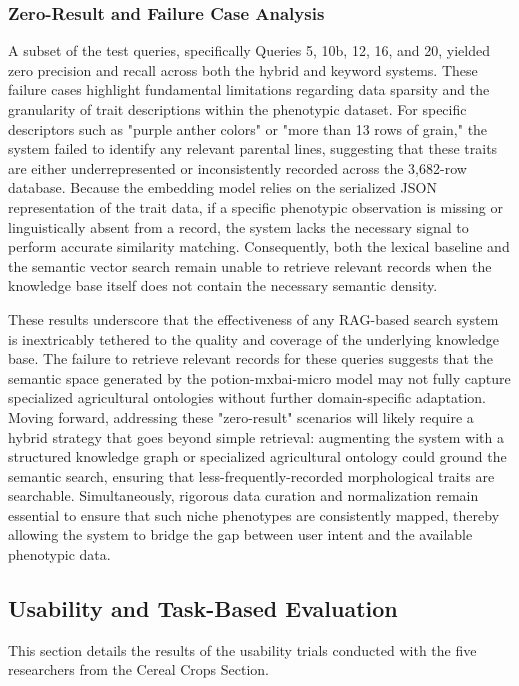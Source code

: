 \documentclass[journal]{./IEEE/IEEEtran}
\begin{document}
\subsubsection{Zero-Result and Failure Case Analysis}
A subset of the test queries, specifically Queries 5, 10b, 12, 16, and 20, yielded zero precision and recall across both the hybrid and keyword systems. These failure cases highlight fundamental limitations regarding data sparsity and the granularity of trait descriptions within the phenotypic dataset. For specific descriptors such as "purple anther colors" or "more than 13 rows of grain," the system failed to identify any relevant parental lines, suggesting that these traits are either underrepresented or inconsistently recorded across the 3,682-row database. Because the embedding model relies on the serialized JSON representation of the trait data, if a specific phenotypic observation is missing or linguistically absent from a record, the system lacks the necessary signal to perform accurate similarity matching. Consequently, both the lexical baseline and the semantic vector search remain unable to retrieve relevant records when the knowledge base itself does not contain the necessary semantic density.

These results underscore that the effectiveness of any RAG-based search system is inextricably tethered to the quality and coverage of the underlying knowledge base. The failure to retrieve relevant records for these queries suggests that the semantic space generated by the potion-mxbai-micro model may not fully capture specialized agricultural ontologies without further domain-specific adaptation. Moving forward, addressing these "zero-result" scenarios will likely require a hybrid strategy that goes beyond simple retrieval: augmenting the system with a structured knowledge graph or specialized agricultural ontology could ground the semantic search, ensuring that less-frequently-recorded morphological traits are searchable. Simultaneously, rigorous data curation and normalization remain essential to ensure that such niche phenotypes are consistently mapped, thereby allowing the system to bridge the gap between user intent and the available phenotypic data.

\subsection{Usability and Task-Based Evaluation}
This section details the results of the usability trials conducted with the five researchers from the Cereal Crops Section.
\end{document}
